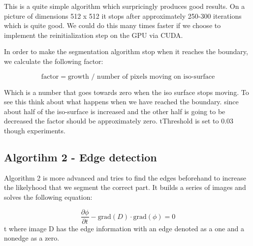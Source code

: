This is a quite simple algorithm which surpricingly produces good results. On a picture of dimensions 512 x 512 it stops after approximately 250-300 iterations which is quite good. We could do this many times faster if we choose to implement the reinitialization step on the GPU via CUDA.

In order to make the segmentation algorithm stop when it reaches the boundary, we calculate the following factor:

\begin{equation*}
 \textrm{factor} = \textrm{growth } / \textrm{ number of pixels moving on iso-surface}
\end{equation*}

Which is a number that goes towards zero when the iso surface stops moving. To see this think about what happens when we have reached the boundary. since about half of the iso-surface is increased and the other half is going to be decreased the factor should be approximately zero. tThreshold is set to 0.03 though experiments.


\subsection{Algortihm 2 - Edge detection}
\label{segmentation:sec:algorithm2}


Algorithm 2 is more advanced and tries to find the edges beforehand to increase the likelyhood that we segment the correct part. It builds a series of images and solves the following equation:

\begin{equation}
\label{segmentation:equation:advanced}
  \dfrac{\partial \phi}{\partial t} - \textrm{grad}(D) \cdot \textrm{grad}(\phi) = 0
\end{equation}
t
where image D has the edge information with an edge denoted as a one and a nonedge as a zero.

